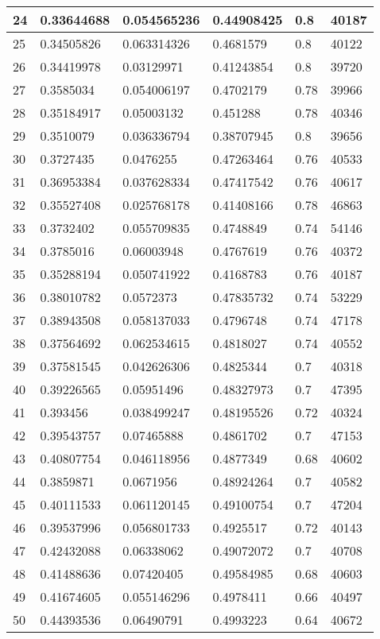 \begin{longtable}{|l|l|l|l|l|l|}
24 & 0.33644688 & 0.054565236 & 0.44908425 & 0.8 & 40187 \\ \hline 
25 & 0.34505826 & 0.063314326 & 0.4681579 & 0.8 & 40122 \\ \hline 
26 & 0.34419978 & 0.03129971 & 0.41243854 & 0.8 & 39720 \\ \hline 
27 & 0.3585034 & 0.054006197 & 0.4702179 & 0.78 & 39966 \\ \hline 
28 & 0.35184917 & 0.05003132 & 0.451288 & 0.78 & 40346 \\ \hline 
29 & 0.3510079 & 0.036336794 & 0.38707945 & 0.8 & 39656 \\ \hline 
30 & 0.3727435 & 0.0476255 & 0.47263464 & 0.76 & 40533 \\ \hline 
31 & 0.36953384 & 0.037628334 & 0.47417542 & 0.76 & 40617 \\ \hline 
32 & 0.35527408 & 0.025768178 & 0.41408166 & 0.78 & 46863 \\ \hline 
33 & 0.3732402 & 0.055709835 & 0.4748849 & 0.74 & 54146 \\ \hline 
34 & 0.3785016 & 0.06003948 & 0.4767619 & 0.76 & 40372 \\ \hline 
35 & 0.35288194 & 0.050741922 & 0.4168783 & 0.76 & 40187 \\ \hline 
36 & 0.38010782 & 0.0572373 & 0.47835732 & 0.74 & 53229 \\ \hline 
37 & 0.38943508 & 0.058137033 & 0.4796748 & 0.74 & 47178 \\ \hline 
38 & 0.37564692 & 0.062534615 & 0.4818027 & 0.74 & 40552 \\ \hline 
39 & 0.37581545 & 0.042626306 & 0.4825344 & 0.7 & 40318 \\ \hline 
40 & 0.39226565 & 0.05951496 & 0.48327973 & 0.7 & 47395 \\ \hline 
41 & 0.393456 & 0.038499247 & 0.48195526 & 0.72 & 40324 \\ \hline 
42 & 0.39543757 & 0.07465888 & 0.4861702 & 0.7 & 47153 \\ \hline 
43 & 0.40807754 & 0.046118956 & 0.4877349 & 0.68 & 40602 \\ \hline 
44 & 0.3859871 & 0.0671956 & 0.48924264 & 0.7 & 40582 \\ \hline 
45 & 0.40111533 & 0.061120145 & 0.49100754 & 0.7 & 47204 \\ \hline 
46 & 0.39537996 & 0.056801733 & 0.4925517 & 0.72 & 40143 \\ \hline 
47 & 0.42432088 & 0.06338062 & 0.49072072 & 0.7 & 40708 \\ \hline 
48 & 0.41488636 & 0.07420405 & 0.49584985 & 0.68 & 40603 \\ \hline 
49 & 0.41674605 & 0.055146296 & 0.4978411 & 0.66 & 40497 \\ \hline 
50 & 0.44393536 & 0.06490791 & 0.4993223 & 0.64 & 40672 \\ \hline 
\end{longtable}
